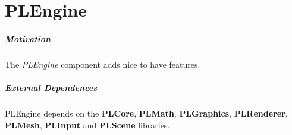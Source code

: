 \chapter{PLEngine}


\paragraph{Motivation}
The \emph{PLEngine} component adds nice to have features.


\paragraph{External Dependences}
PLEngine depends on the \textbf{PLCore}, \textbf{PLMath}, \textbf{PLGraphics}, \textbf{PLRenderer}, \textbf{PLMesh}, \textbf{PLInput} and \textbf{PLScene} libraries.





\cleardoublepage

